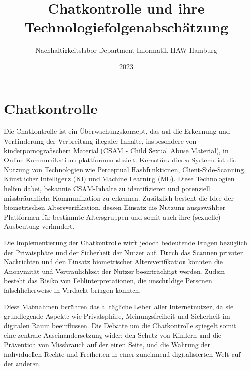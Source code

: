 \documentclass[a4paper]{article}
\title{Chatkontrolle und ihre Technologiefolgenabschätzung}
\author{Nachhaltigkeitslabor Department Informatik HAW Hamburg}
\date{2023}
\begin{document}
\maketitle

\section {Chatkontrolle}
Die Chatkontrolle ist ein Überwachungskonzept, das auf die Erkennung und Verhinderung der Verbreitung illegaler Inhalte, insbesondere von kinderpornografischem Material (CSAM - Child Sexual Abuse Material), in Online-Kommunikations-plattformen abzielt. Kernstück dieses Systems ist die Nutzung von Technologien wie Perceptual Hashfunktionen, Client-Side-Scanning, Künstlicher Intelligenz (KI) und Machine Learning (ML). Diese Technologien helfen dabei, bekannte CSAM-Inhalte zu identifizieren und potenziell missbräuchliche Kommunikation zu erkennen. Zusätzlich besteht die Idee der biometrischen Altersverifikation, dessen Einsatz die Nutzung ausgewählter Plattformen für bestimmte Altersgruppen und somit auch ihre (sexuelle) Ausbeutung verhindert.



Die Implementierung der Chatkontrolle wirft jedoch bedeutende Fragen bezüglich der Privatsphäre und der Sicherheit der Nutzer auf. Durch das Scannen privater Nachrichten und den Einsatz biometrischer Altersverifikation könnten die Anonymität und Vertraulichkeit der Nutzer beeinträchtigt werden. Zudem besteht das Risiko von Fehlinterpretationen, die unschuldige Personen fälschlicherweise in Verdacht bringen könnten.

Diese Maßnahmen berühren das alltägliche Leben aller Internetnutzer, da sie grundlegende Aspekte wie Privatsphäre, Meinungsfreiheit und Sicherheit im digitalen Raum beeinflussen. Die Debatte um die Chatkontrolle spiegelt somit eine zentrale Auseinandersetzung wider: den Schutz von Kindern und die Prävention von Missbrauch auf der einen Seite, und die Wahrung der individuellen Rechte und Freiheiten in einer zunehmend digitalisierten Welt auf der anderen.
\end{document}

